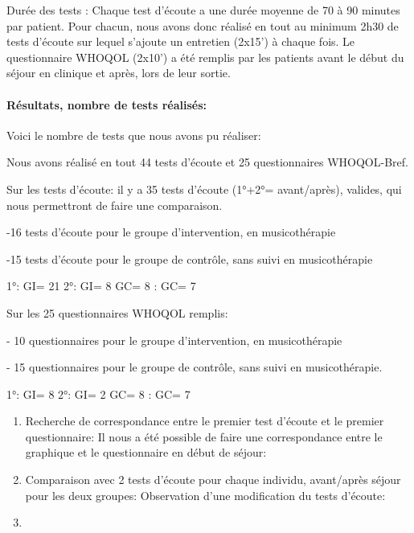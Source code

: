 	
	
	Durée des tests : Chaque test d'écoute a une durée  moyenne de
        70 à 90 minutes par patient. Pour chacun, nous avons donc réalisé
        en tout au minimum 2h30 de tests d'écoute sur lequel
        s'ajoute un
        entretien (2x15') à chaque fois.
        Le questionnaire WHOQOL (2x10')  a été remplis par les
        patients avant le début du séjour en clinique et après, lors
        de leur sortie.
        
       
      
      \paragraph{Résultats, nombre de tests réalisés:}


        
        Voici le nombre de tests que nous avons pu réaliser:
        
     Nous avons réalisé en tout 44 tests d'écoute et 25 questionnaires 
     WHOQOL-Bref.
     
     Sur les tests d'écoute: il y a 35 tests d'écoute (1°+2°=
     avant/après), valides, qui nous permettront de faire une comparaison.
     
     -16 tests d'écoute pour le groupe d'intervention, en musicothérapie
     
     -15 tests d'écoute pour le groupe de contrôle, sans suivi en 
     musicothérapie

     1°: GI= 21                        2°: GI= 8
           GC= 8                            : GC= 7

     
           Sur les 25  questionnaires WHOQOL remplis:
           
     - 10 questionnaires pour le groupe d'intervention, en musicothérapie
     
     - 15 questionnaires pour le groupe de contrôle, sans suivi en 
     musicothérapie.

     
     1°: GI= 8                        2°: GI= 2
           GC= 8                            : GC= 7
     
     
           \begin{enumerate}
             
        \item Recherche de correspondance entre le premier test d'écoute et
     le premier questionnaire: Il nous a été possible de faire une
     correspondance entre le graphique et le questionnaire en début de
     séjour:


     
     
        \item Comparaison avec 2 tests d'écoute pour chaque individu,
          avant/après séjour pour les deux groupes:
          Observation d'une modification du tests d'écoute:


          
        
        \item
\end{enumerate}

